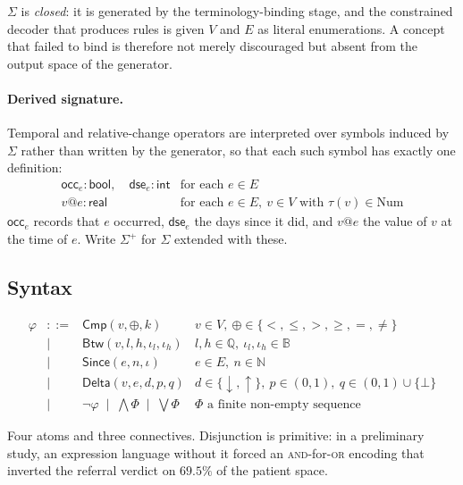$\Sigma$ is \emph{closed}: it is generated by the terminology-binding stage, and
the constrained decoder that produces rules is given $V$ and $E$ as literal
enumerations. A concept that failed to bind is therefore not merely discouraged
but absent from the output space of the generator.

\paragraph{Derived signature.}
Temporal and relative-change operators are interpreted over symbols induced by
$\Sigma$ rather than written by the generator, so that each such symbol has
exactly one definition:
\[
\begin{array}{ll}
  \mathsf{occ}_e : \mathsf{bool}, \quad \mathsf{dse}_e : \mathsf{int}
    & \text{for each } e \in E \\
  v@e : \mathsf{real}
    & \text{for each } e \in E,\ v \in V \text{ with } \tau(v) \in \mathrm{Num}
\end{array}
\]
$\mathsf{occ}_e$ records that $e$ occurred, $\mathsf{dse}_e$ the days since it
did, and $v@e$ the value of $v$ at the time of $e$. Write $\Sigma^{+}$ for
$\Sigma$ extended with these.

\subsection{Syntax}

\[
\begin{array}{rcll}
  \varphi & ::= & \mathsf{Cmp}(v, \oplus, k)
    & v \in V,\ \oplus \in \{<,\le,>,\ge,=,\neq\} \\
  & \mid & \mathsf{Btw}(v, l, h, \iota_l, \iota_h)
    & l,h \in \mathbb{Q},\ \iota_l,\iota_h \in \mathbb{B} \\
  & \mid & \mathsf{Since}(e, n, \iota)
    & e \in E,\ n \in \mathbb{N} \\
  & \mid & \mathsf{Delta}(v, e, d, p, q)
    & d \in \{\downarrow,\uparrow\},\ p \in (0,1),\ q \in (0,1) \cup \{\bot\} \\
  & \mid & \neg\varphi \;\mid\; \textstyle\bigwedge \Phi \;\mid\; \bigvee \Phi
    & \Phi \text{ a finite non-empty sequence}
\end{array}
\]

Four atoms and three connectives. Disjunction is primitive: in a preliminary
study, an expression language without it forced an \textsc{and}-for-\textsc{or}
encoding that inverted the referral verdict on $69.5\%$ of the patient space.

